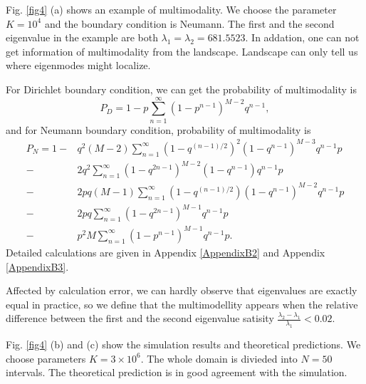 \documentclass[a4paper,11pt]{article}
\begin{document}
Fig. \ref{fig4} (a) shows an example of multimodality. We choose the parameter $K = 10^4$ and the boundary condition is Neumann. The first and the second eigenvalue in the example are both $\lambda_1 = \lambda_2 = 681.5523$. In addation, one can not get information of multimodality from the landscape. Landscape can only tell us where eigenmodes might localize.

For Dirichlet boundary condition, we can get the probability of multimodality is
\begin{equation}\label{multiD}
P_D = 1 - p \sum_{n=1}^{\infty} (1 - p^{n-1})^{M-2} q^{n-1},
\end{equation}
and for Neumann boundary condition, probability of multimodality is
\begin{equation}\label{multiN}
\begin{split}
P_N = 1 - & q^2 (M-2) \sum_{n=1}^{\infty} (1 - q^{(n-1)/2})^2 (1 - q^{n-1})^{M-3} q^{n-1} p \\
- & 2 q^2 \sum_{n=1}^{\infty} (1 - q^{2n-1})^{M-2} (1 - q^{n-1}) q^{n-1} p \\
- & 2 p q (M-1) \sum_{n=1}^{\infty} (1 - q^{(n-1)/2}) (1 - q^{n-1})^{M-2} q^{n-1} p \\
- & 2 p q \sum_{n=1}^{\infty} (1 - q^{2n-1})^{M-1} q^{n-1} p \\
- & p^2 M \sum_{n=1}^{\infty} (1 - p^{n-1})^{M-1} q^{n-1} p.
\end{split}
\end{equation}
Detailed calculations are given in Appendix \ref{AppendixB2} and Appendix \ref{AppendixB3}.

Affected by calculation error, we can hardly observe that eigenvalues are exactly equal in practice, so we define that the multimodellity appears when the relative difference between the first and the second eigenvalue satisity $\frac{\lambda_2 - \lambda_1}{\lambda_1} < 0.02$.

Fig. \ref{fig4} (b) and (c) show the simulation results and theoretical predictions. We choose parameters $K = 3 \times 10^6$. The whole domain is divieded into $N = 50$ intervals. The theoretical prediction is in good agreement with the simulation.
\end{document}
